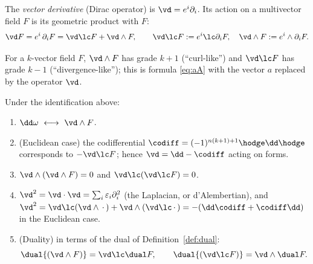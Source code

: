 \begin{definition}
The \emph{vector derivative} (Dirac operator) is $\vd=e^i\partial_i$. Its action on a multivector field $F$ is its geometric product with $F$:
\[
 \vd F=e^i\,\partial_iF=\vd\lc F+\vd\wedge F,\qquad \vd\lc F:=e^i\lc\partial_iF,\quad \vd\wedge F:=e^i\wedge\partial_iF .
\]
\end{definition}

For a $k$-vector field $F$, $\vd\wedge F$ has grade $k+1$ (``curl-like'') and $\vd\lc F$ has grade $k-1$ (``divergence-like''); this is formula \eqref{eq:aA} with the vector $a$ replaced by the operator $\vd$.

\begin{theorem}[$\dd$ is $\vd\wedge$]\label{thm:dGA}
Under the identification above:
\begin{enumerate}
  \item $\dd\omega\ \longleftrightarrow\ \vd\wedge F$.
  \item (Euclidean case) the codifferential $\codiff=(-1)^{n(k+1)+1}\hodge\dd\hodge$ corresponds to $-\vd\lc F$; hence $\vd=\dd-\codiff$ acting on forms.
  \item $\vd\wedge(\vd\wedge F)=0$ and $\vd\lc(\vd\lc F)=0$.
  \item $\vd^2=\vd\cdot\vd=\sum_i\varepsilon_i\partial_i^2$ (the Laplacian, or d'Alembertian), and $\vd^2=\vd\lc(\vd\wedge\,\cdot\,)+\vd\wedge(\vd\lc\,\cdot\,)=-(\dd\codiff+\codiff\dd)$ in the Euclidean case.
  \item (Duality) in terms of the dual of Definition~\ref{def:dual}:
  \[
   \dual{(\vd\wedge F)}=\vd\lc\dual F,\qquad \dual{(\vd\lc F)}=\vd\wedge\dual F .
  \]
\end{enumerate}
\end{theorem}
